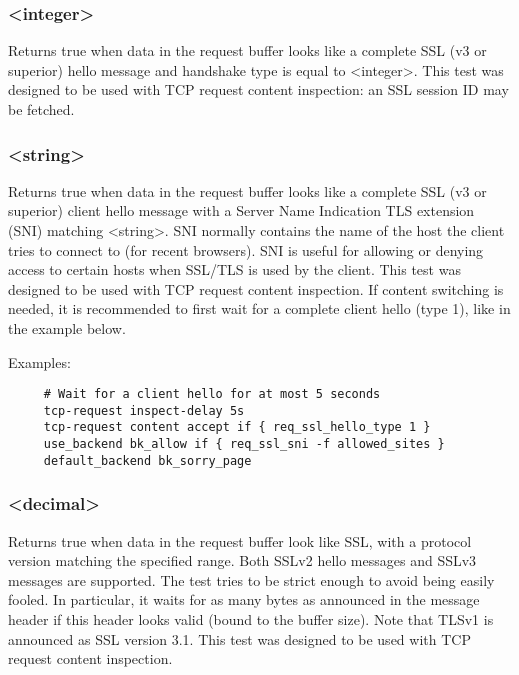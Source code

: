 \subsubsection[req\_ssl\_hello\_type]{ <integer>}

  Returns true when data in the request buffer looks like a complete SSL (v3
  or superior) hello message and handshake type is equal to <integer>.
  This test was designed to be used with TCP request content inspection: an
  SSL session ID may be fetched.

\subsubsection[req\_ssl\_sni]{ <string>}

  Returns true when data in the request buffer looks like a complete SSL (v3
  or superior) client hello message with a Server Name Indication TLS extension
  (SNI) matching <string>. SNI normally contains the name of the host the
  client tries to connect to (for recent browsers). SNI is useful for allowing
  or denying access to certain hosts when SSL/TLS is used by the client. This
  test was designed to be used with TCP request content inspection. If content
  switching is needed, it is recommended to first wait for a complete client
  hello (type 1), like in the example below.

  Examples:
  \begin{verbatim}
     # Wait for a client hello for at most 5 seconds
     tcp-request inspect-delay 5s
     tcp-request content accept if { req_ssl_hello_type 1 }
     use_backend bk_allow if { req_ssl_sni -f allowed_sites }
     default_backend bk_sorry_page  
  \end{verbatim}

\subsubsection[req\_ssl\_ver]{ <decimal>}

  Returns true when data in the request buffer look like SSL, with a protocol
  version matching the specified range. Both SSLv2 hello messages and SSLv3
  messages are supported. The test tries to be strict enough to avoid being
  easily fooled. In particular, it waits for as many bytes as announced in the
  message header if this header looks valid (bound to the buffer size). Note
  that TLSv1 is announced as SSL version 3.1. This test was designed to be used
  with TCP request content inspection.

